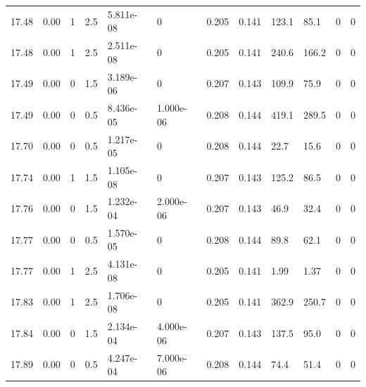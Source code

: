 \documentclass[preview]{standalone}
\begin{document}
{{{{{\begin{tabular}{L{1.2cm}C{1.2cm} C{0.3cm}C{0.5cm} C{1.4cm}C{1.4cm} C{1.4cm}C{1.4cm} C{1.6cm}C{1.6cm} C{1.6cm}C{1.6cm}}
  17.48  &  0.00  & 1     & 2.5 &  5.811e-08  & 0  &  0.205&   0.141& 123.1 & 85.1   &  0 & 0  \\ 
  17.48  &  0.00  & 1     & 2.5 &  2.511e-08  & 0  &  0.205&   0.141& 240.6 & 166.2   &  0 & 0  \\ 
  17.49  &  0.00  & 0     & 1.5 &  3.189e-06  & 0  &  0.207&   0.143& 109.9 & 75.9   &  0 & 0  \\ 
  17.49  &  0.00  & 0     & 0.5 &  8.436e-05  & 1.000e-06  &  0.208&   0.144& 419.1 & 289.5   &  0 & 0  \\ 
  17.70  &  0.00  & 0     & 0.5 &  1.217e-05  & 0  &  0.208&   0.144& 22.7 & 15.6   &  0 & 0  \\ 
  17.74  &  0.00  & 1     & 1.5 &  1.105e-08  & 0  &  0.207&   0.143& 125.2 & 86.5   &  0 & 0  \\ 
  17.76  &  0.00  & 0     & 1.5 &  1.232e-04  & 2.000e-06  &  0.207&   0.143& 46.9 & 32.4   &  0 & 0  \\ 
  17.77  &  0.00  & 0     & 0.5 &  1.570e-05  & 0  &  0.208&   0.144& 89.8 & 62.1   &  0 & 0  \\ 
  17.77  &  0.00  & 1     & 2.5 &  4.131e-08  & 0  &  0.205&   0.141& 1.99 & 1.37   &  0 & 0  \\ 
  17.83  &  0.00  & 1     & 2.5 &  1.706e-08  & 0  &  0.205&   0.141& 362.9 & 250.7   &  0 & 0  \\ 
  17.84  &  0.00  & 0     & 1.5 &  2.134e-04  & 4.000e-06  &  0.207&   0.143& 137.5 & 95.0   &  0 & 0  \\ 
  17.89  &  0.00  & 0     & 0.5 &  4.247e-04  & 7.000e-06  &  0.208&   0.144& 74.4 & 51.4   &  0 & 0  \\ 
\hline 
\end{tabular} 

}}}}}
\end{document}
